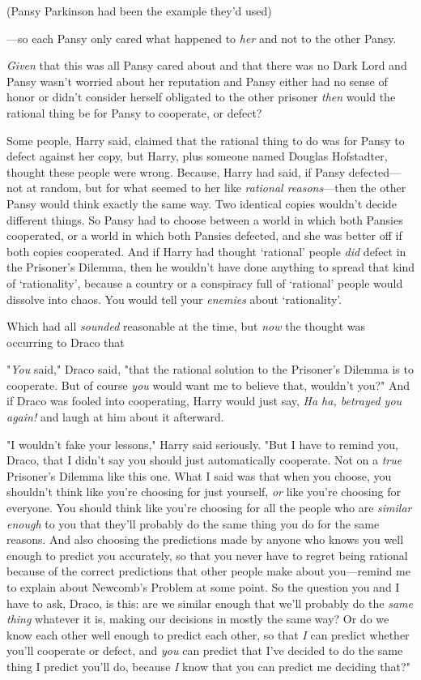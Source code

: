 (Pansy Parkinson had been the example they'd used)

---so each Pansy only cared what happened to \emph{her} and not to the other
Pansy.

\emph{Given} that this was all Pansy cared about{\el} and that there was no
Dark Lord{\el} and Pansy wasn't worried about her reputation{\el} and
Pansy either had no sense of honor or didn't consider herself obligated to the
other prisoner{\el} \emph{then} would the rational thing be for Pansy to
cooperate, or defect?

Some people, Harry said, claimed that the rational thing to do was for Pansy to
defect against her copy, but Harry, plus someone named Douglas Hofstadter,
thought these people were wrong. Because, Harry had said, if Pansy
defected---not at random, but for what seemed to her like \emph{rational
reasons}---then the other Pansy would think exactly the same way. Two identical
copies wouldn't decide different things. So Pansy had to choose between a world
in which both Pansies cooperated, or a world in which both Pansies defected,
and she was better off if both copies cooperated. And if Harry had thought
`rational' people \emph{did} defect in the Prisoner's Dilemma, then he wouldn't
have done anything to spread that kind of `rationality', because a country or a
conspiracy full of `rational' people would dissolve into chaos. You would tell
your \emph{enemies} about `rationality'.

Which had all \emph{sounded} reasonable at the time, but \emph{now} the thought
was occurring to Draco that{\el}

"\emph{You} said," Draco said, "that the rational solution to the Prisoner's
Dilemma is to cooperate. But of course \emph{you} would want me to believe
that, wouldn't you?" And if Draco was fooled into cooperating, Harry would just
say, \emph{Ha ha, betrayed you again!} and laugh at him about it afterward.

"I wouldn't fake your lessons," Harry said seriously. "But I have to remind
you, Draco, that I didn't say you should just automatically cooperate. Not on a
\emph{true} Prisoner's Dilemma like this one. What I said was that when you
choose, you shouldn't think like you're choosing for just yourself, \emph{or}
like you're choosing for everyone. You should think like you're choosing for
all the people who are \emph{similar enough} to you that they'll probably do
the same thing you do for the same reasons. And also choosing the predictions
made by anyone who knows you well enough to predict you accurately, so that you
never have to regret being rational because of the correct predictions that
other people make about you---remind me to explain about Newcomb's Problem at
some point. So the question you and I have to ask, Draco, is this: are we
similar enough that we'll probably do the \emph{same thing} whatever it is,
making our decisions in mostly the same way? Or do we know each other well
enough to predict each other, so that \emph{I} can predict whether you'll
cooperate or defect, and \emph{you} can predict that I've decided to do the
same thing I predict you'll do, because \emph{I} know that you can predict me
deciding that?"

